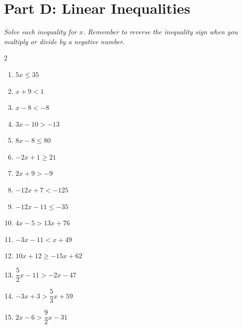 \documentclass[11pt]{article}
\begin{document}
\section*{Part D: Linear Inequalities}
\noindent\textit{Solve each inequality for $x$. Remember to reverse the inequality sign when you multiply or divide by a negative number.}
\begin{multicols}{2}
\begin{enumerate}
  \item $5x \le 35$
  \vspace{1.8cm}
  \item $x + 9 < 1$
  \vspace{1.8cm}
  \item $x - 8 < -8$
  \vspace{1.8cm}
  \item $3x - 10 > -13$
  \vspace{1.8cm}
  \item $8x - 8 \le 80$
  \vspace{1.8cm}
  \item $-2x + 1 \ge 21$
  \vspace{1.8cm}
  \item $2x + 9 > -9$
  \vspace{1.8cm}
  \item $-12x + 7 < -125$
  \vspace{1.8cm}
  \item $-12x - 11 \le -35$
  \vspace{1.8cm}
  \item $4x - 5 > 13x + 76$
  \vspace{1.8cm}
  \item $-3x - 11 < x + 49$
  \vspace{1.8cm}
  \item $10x + 12 \ge -15x + 62$
  \vspace{1.8cm}
  \item $\dfrac{5}{2}x - 11 > -2x - 47$
  \vspace{1.8cm}
  \item $-3x + 3 > \dfrac{5}{3}x + 59$
  \vspace{1.8cm}
  \item $2x - 6 > \dfrac{9}{2}x - 31$
  \vspace{1.8cm}
\end{enumerate}
\end{multicols}
\end{document}
